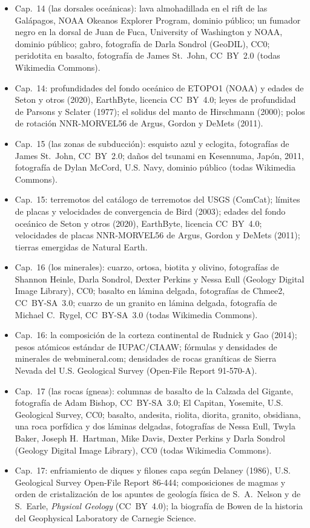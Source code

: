 \begin{itemize}
  \item Cap.~14 (las dorsales oceánicas): lava almohadillada en el rift de las Galápagos, NOAA Okeanos Explorer Program, dominio público; un fumador negro en la dorsal de Juan de Fuca, University of Washington y NOAA, dominio público; gabro, fotografía de Darla Sondrol (GeoDIL), CC0; peridotita en basalto, fotografía de James St.~John, CC~BY~2.0 (todas Wikimedia Commons).
  \item Cap.~14: profundidades del fondo oceánico de ETOPO1 (NOAA) y edades de Seton y otros (2020), EarthByte, licencia CC~BY~4.0; leyes de profundidad de Parsons y Sclater (1977); el solidus del manto de Hirschmann (2000); polos de rotación NNR-MORVEL56 de Argus, Gordon y DeMets (2011).
  \item Cap.~15 (las zonas de subducción): esquisto azul y eclogita, fotografías de James St.~John, CC~BY~2.0; daños del tsunami en Kesennuma, Japón, 2011, fotografía de Dylan McCord, U.S. Navy, dominio público (todas Wikimedia Commons).
  \item Cap.~15: terremotos del catálogo de terremotos del USGS (ComCat); límites de placas y velocidades de convergencia de Bird (2003); edades del fondo oceánico de Seton y otros (2020), EarthByte, licencia CC~BY~4.0; velocidades de placas NNR-MORVEL56 de Argus, Gordon y DeMets (2011); tierras emergidas de Natural Earth.
  \item Cap.~16 (los minerales): cuarzo, ortosa, biotita y olivino, fotografías de Shannon Heinle, Darla Sondrol, Dexter Perkins y Nessa Eull (Geology Digital Image Library), CC0; basalto en lámina delgada, fotografías de Chmee2, CC~BY-SA~3.0; cuarzo de un granito en lámina delgada, fotografía de Michael C.~Rygel, CC~BY-SA~3.0 (todas Wikimedia Commons).
  \item Cap.~16: la composición de la corteza continental de Rudnick y Gao (2014); pesos atómicos estándar de IUPAC/CIAAW; fórmulas y densidades de minerales de webmineral.com; densidades de rocas graníticas de Sierra Nevada del U.S. Geological Survey (Open-File Report 91-570-A).
  \item Cap.~17 (las rocas ígneas): columnas de basalto de la Calzada del Gigante, fotografía de Adam Bishop, CC~BY-SA~3.0; El Capitan, Yosemite, U.S. Geological Survey, CC0; basalto, andesita, riolita, diorita, granito, obsidiana, una roca porfídica y dos láminas delgadas, fotografías de Nessa Eull, Twyla Baker, Joseph H.~Hartman, Mike Davis, Dexter Perkins y Darla Sondrol (Geology Digital Image Library), CC0 (todas Wikimedia Commons).
  \item Cap.~17: enfriamiento de diques y filones capa según Delaney (1986), U.S. Geological Survey Open-File Report 86-444; composiciones de magmas y orden de cristalización de los apuntes de geología física de S.~A.~Nelson y de S.~Earle, \emph{Physical Geology} (CC~BY~4.0); la biografía de Bowen de la historia del Geophysical Laboratory de Carnegie Science.

\end{itemize}
